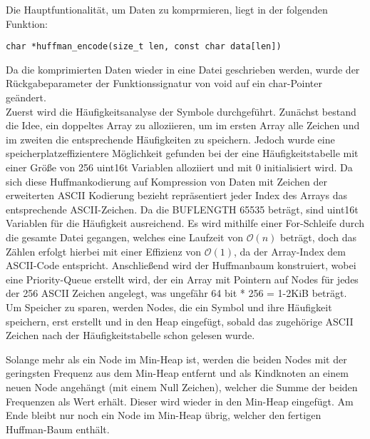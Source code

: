 \documentclass[course=erap]{aspdoc}
\begin{document}
Die Hauptfuntionalität, um Daten zu komprmieren, liegt in der folgenden Funktion:

\begin{center}
    \begin{lstlisting}[frame=single, framerule=0pt, numbers=none]
        char *huffman_encode(size_t len, const char data[len])
    \end{lstlisting}
\end{center}
Da die komprimierten Daten wieder in eine Datei geschrieben werden, wurde der Rückgabeparameter der Funktionssignatur von void auf ein char-Pointer geändert.\\
Zuerst wird die Häufigkeitsanalyse der Symbole durchgeführt. Zunächst bestand die Idee, ein doppeltes Array zu alloziieren, um im ersten Array alle Zeichen und im zweiten die entsprechende Häufigkeiten zu speichern. Jedoch wurde eine speicherplatzeffizientere Möglichkeit gefunden bei der eine Häufigkeitstabelle mit einer Größe von 256 uint16\textunderscore t Variablen alloziiert und mit 0 initialisiert wird. Da sich diese Huffmankodierung auf Kompression von Daten mit Zeichen der erweiterten ASCII Kodierung bezieht repräsentiert jeder Index des Arrays das entsprechende ASCII-Zeichen. Da die BUF\textunderscore LENGTH 65535 beträgt, sind uint16\textunderscore t Variablen für die Häufigkeit ausreichend.
Es wird mithilfe einer For-Schleife durch die gesamte Datei gegangen, welches eine Laufzeit von $\mathcal{O}(n)$ beträgt, doch das Zählen erfolgt hierbei mit einer Effizienz von $\mathcal{O}(1)$, da der Array-Index dem ASCII-Code entspricht.
Anschließend wird der Huffmanbaum konstruiert, wobei eine Priority-Queue erstellt wird, der ein Array mit Pointern auf Nodes für jedes der 256 ASCII Zeichen angelegt, was  ungefähr 64 bit * 256 = 1-2KiB beträgt. Um Speicher zu sparen, werden Nodes, die ein Symbol und ihre Häufigkeit speichern, erst erstellt und in den Heap eingefügt, sobald das zugehörige ASCII Zeichen nach der Häufigkeitstabelle schon gelesen wurde. %

Solange mehr als ein Node im Min-Heap ist, werden die beiden Nodes mit der geringsten Frequenz aus dem Min-Heap entfernt und als Kindknoten an einem neuen Node angehängt (mit einem Null Zeichen), welcher die Summe der beiden Frequenzen als Wert erhält. Dieser wird wieder in den Min-Heap eingefügt.
Am Ende bleibt nur noch ein Node im Min-Heap übrig, welcher den fertigen Huffman-Baum enthält.
\end{document}
